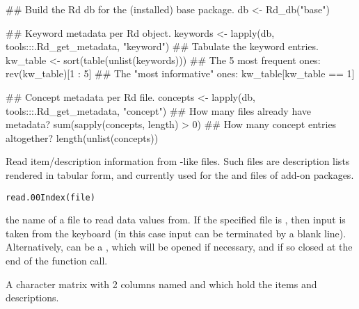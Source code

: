 %
\begin{SeeAlso}\relax
{}
\end{SeeAlso}
%
\begin{Examples}
\begin{ExampleCode}

## Build the Rd db for the (installed) base package.
db <- Rd_db("base")

## Keyword metadata per Rd object.
keywords <- lapply(db, tools:::.Rd_get_metadata, "keyword")
## Tabulate the keyword entries.
kw_table <- sort(table(unlist(keywords)))
## The 5 most frequent ones:
rev(kw_table)[1 : 5]
## The "most informative" ones:
kw_table[kw_table == 1]

## Concept metadata per Rd file.
concepts <- lapply(db, tools:::.Rd_get_metadata, "concept")
## How many files already have \concept metadata?
sum(sapply(concepts, length) > 0)
## How many concept entries altogether?
length(unlist(concepts))
\end{ExampleCode}
\end{Examples}
%
\begin{Description}\relax
Read item/description information from -like files.  Such
files are description lists rendered in tabular form, and currently
used for the  and  files of add-on
packages.
\end{Description}
%
\begin{Usage}
\begin{verbatim}
read.00Index(file)
\end{verbatim}
\end{Usage}
%
\begin{Arguments}
\begin{ldescription}
\item[\code{file}] the name of a file to read data values from.  If the
specified file is , then input is taken from the keyboard
(in this case input can be terminated by a blank line).
Alternatively,  can be a , which
will be opened if necessary, and if so closed at the end of the
function call.
\end{ldescription}
\end{Arguments}
%
\begin{Value}
A character matrix with 2 columns named  and
 which hold the items and descriptions.
\end{Value}

